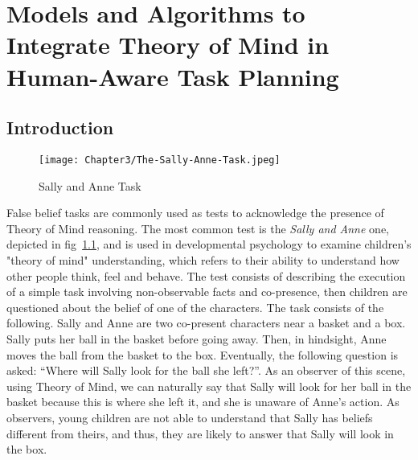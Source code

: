 \ifdefined{}
\else
\setcounter{chapter}{2} %
\dominitoc
\faketableofcontents
\fi

\chapter{Models and Algorithms to Integrate Theory of Mind in Human-Aware Task Planning}
\label{chap:3}
\minitoc


\section{Introduction}



\begin{figure}
    \centering
    \texttt{[image: Chapter3/The-Sally-Anne-Task.jpeg]}
    \caption{Sally and Anne Task}
    \label{fig:sally_and_anne_task}
\end{figure}

False belief tasks are commonly used as tests to acknowledge the presence of Theory of Mind reasoning. The most common test is the \textit{Sally and Anne} one, depicted in fig~\ref{fig:sally_and_anne_task}, and is used in developmental psychology to examine children's "theory of mind" understanding, which refers to their ability to understand how other people think, feel and behave. The test consists of describing the execution of a simple task involving non-observable facts and co-presence, then children are questioned about the belief of one of the characters. The task consists of the following. Sally and Anne are two co-present characters near a basket and a box. Sally puts her ball in the basket before going away. Then, in hindsight, Anne moves the ball from the basket to the box. Eventually, the following question is asked: ``Where will Sally look for the ball she left?''. As an observer of this scene, using Theory of Mind, we can naturally say that Sally will look for her ball in the basket because this is where she left it, and she is unaware of Anne's action. As observers, young children are not able to understand that Sally has beliefs different from theirs, and thus, they are likely to answer that Sally will look in the box. 

